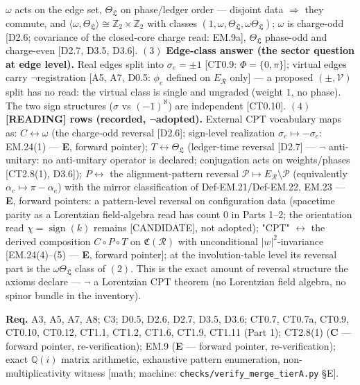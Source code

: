 \begin{theorem}
$\omega$ acts on the edge set, $\Theta_{\mathfrak L}$ on phase/ledger order — disjoint data $\Rightarrow$ they commute, and $\langle\omega,\Theta_{\mathfrak L}\rangle\cong\mathbb Z_2\times\mathbb Z_2$ with classes $(1,\omega,\Theta_{\mathfrak L},\omega\Theta_{\mathfrak L})$; $\omega$ is charge-odd [D2.6; covariance of the closed-core charge read: EM.9a], $\Theta_{\mathfrak L}$ phase-odd and charge-even [D2.7, D3.5, D3.6]. $(3)$ \textbf{Edge-class answer (the sector question at edge level).} Real edges split into $\sigma_e=\pm1$ [CT0.9: $\Phi=\{0,\pi\}$]; virtual edges carry $\neg$registration [A5, A7, D0.5: $\phi_e$ defined on $E_{\mathcal R}$ only] — a proposed $(\pm,\mathcal V)$ split has no read: the virtual class is single and ungraded (weight $1$, no phase). The two sign structures ($\sigma$ vs $(-1)^{\aleph}$) are independent [CT0.10]. $(4)$ \textbf{[READING] rows (recorded, $\neg$adopted).} External CPT vocabulary maps as: $C\leftrightarrow\omega$ (the charge-odd reversal [D2.6]; sign-level realization $\sigma_e\mapsto-\sigma_e$: EM.24(1) — \textbf{E}, forward pointer); $T\leftrightarrow\Theta_{\mathfrak L}$ (ledger-time reversal [D2.7] — $\neg$ anti-unitary: no anti-unitary operator is declared; conjugation acts on weights/phases [CT2.8(1), D3.6]); $P\leftrightarrow$ the alignment-pattern reversal $\mathcal P\mapsto E_{\mathcal R}\setminus\mathcal P$ (equivalently $\alpha_e\mapsto\pi-\alpha_e$) with the mirror classification of Def-EM.21/Def-EM.22, EM.23 — \textbf{E}, forward pointers: a pattern-level reversal on configuration data (spacetime parity as a Lorentzian field-algebra read has count $0$ in Parts 1–2; the orientation read $\chi=\operatorname{sign}(k)$ remains [CANDIDATE], not adopted); "CPT" $\leftrightarrow$ the derived composition $C\circ P\circ T$ on $\mathfrak C(\mathcal R)$ with unconditional $|w|^2$-invariance [EM.24(4)–(5) — \textbf{E}, forward pointer]; at the involution-table level its reversal part is the $\omega\Theta_{\mathfrak L}$ class of $(2)$. This is the exact amount of reversal structure the axioms declare — $\neg$ a Lorentzian CPT theorem (no Lorentzian field algebra, no spinor bundle in the inventory).

\textbf{Req.} A3, A5, A7, A8; C3; D0.5, D2.6, D2.7, D3.5, D3.6; CT0.7, CT0.7a, CT0.9, CT0.10, CT0.12, CT1.1, CT1.2, CT1.6, CT1.9, CT1.11 (Part 1); CT2.8(1) (\textbf{C} — forward pointer, re-verification); EM.9 (\textbf{E} — forward pointer, re-verification); exact $\mathbb Q(i)$ matrix arithmetic, exhaustive pattern enumeration, non-multiplicativity witness [math; machine: \texttt{checks/\allowbreak{}verify\_\allowbreak{}merge\_\allowbreak{}tierA.py} §E].


\end{theorem}
